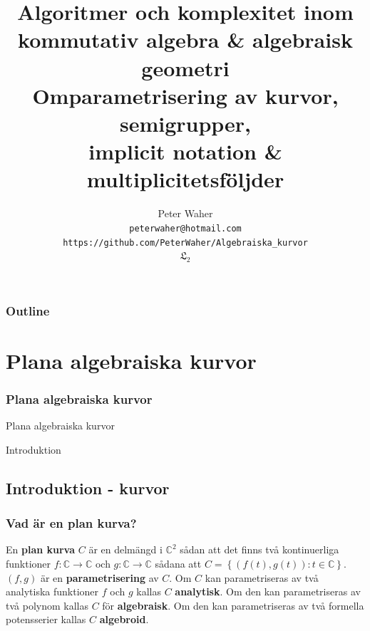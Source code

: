 \documentclass{beamer}
\title[Algoritmer och komplexitet inom algebraisk geometri]{
	Algoritmer och komplexitet inom \\
	kommutativ algebra \& algebraisk geometri \\[10pt]
	\large Omparametrisering av kurvor, semigrupper, \\
	implicit notation \& multiplicitetsföljder}
\author[Peter Waher]{Peter Waher \\[5pt]
	\texttt{peterwaher@hotmail.com}\\
	\texttt{https://github.com/PeterWaher/Algebraiska\_kurvor}\\[5pt]
	$\mathfrak{L}_2$}
\begin{document}
\begin{frame}
	\titlepage
\end{frame}

\begin{frame}
	\frametitle{Outline}
	\tableofcontents[pausesections]
\end{frame}





\section{Plana algebraiska kurvor}

\begin{frame}
	\frametitle{Plana algebraiska kurvor}
	\begin{center}
		\Large Plana algebraiska kurvor
		
		Introduktion
	\end{center}
\end{frame}

\subsection{Introduktion - kurvor}

\begin{frame}
\frametitle{Vad är en plan kurva?}
\begin{Definition}
	En \textbf{plan kurva} $C$ är en delmängd i $\mathbb{C}^2$ sådan att det finns två kontinuerliga funktioner $f : \mathbb{C} \rightarrow \mathbb{C}$ och 
	$g : \mathbb{C} \rightarrow \mathbb{C}$ sådana att $C = \left\{\left(f(t), g(t)\right) : t \in \mathbb{C}\right\}$. $(f, g)$ är en \textbf{parametrisering} av $C$. Om $C$ kan parametriseras av två analytiska funktioner $f$ och $g$ kallas $C$ \textbf{analytisk}. Om den kan parametriseras av två polynom kallas $C$ för \textbf{algebraisk}. Om den kan parametriseras av två formella potensserier kallas $C$ \textbf{algebroid}.
\end{Definition}
\end{frame}
\end{document}
